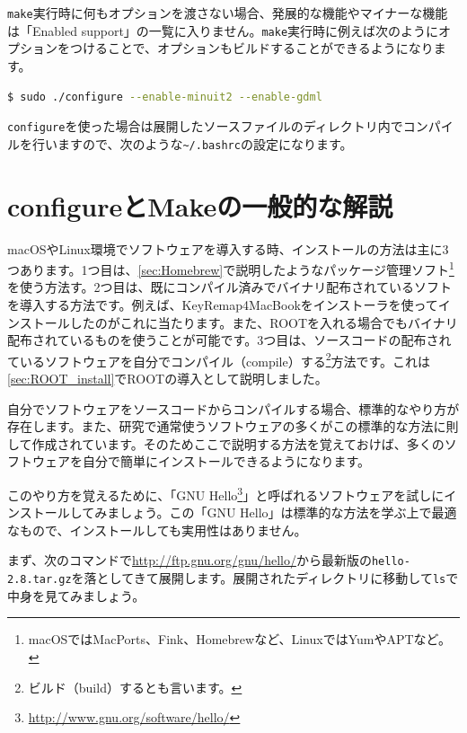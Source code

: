 \texttt{make}実行時に何もオプションを渡さない場合、発展的な機能やマイナーな機能は「Enabled support」の一覧に入りません。\texttt{make}実行時に例えば次のようにオプションをつけることで、オプションもビルドすることができるようになります。

\begin{lstlisting}[language=bash]
$ sudo ./configure --enable-minuit2 --enable-gdml
\end{lstlisting}

\texttt{configure}を使った場合は展開したソースファイルのディレクトリ内でコンパイルを行いますので、次のような\texttt{\~{}/.bashrc}の設定になります。
\begin{NoFloat}

\end{NoFloat}

\section{configureとMakeの一般的な解説}

macOSやLinux環境でソフトウェアを導入する時、インストールの方法は主に3つあります。1つ目は、\ref{sec:Homebrew}で説明したようなパッケージ管理ソフト\footnote{macOSではMacPorts、Fink、Homebrewなど、LinuxではYumやAPTなど。}を使う方法す。2つ目は、既にコンパイル済みでバイナリ配布されているソフトを導入する方法です。例えば、KeyRemap4MacBookをインストーラを使ってインストールしたのがこれに当たります。また、ROOTを入れる場合でもバイナリ配布されているものを使うことが可能です。3つ目は、ソースコードの配布されているソフトウェアを自分でコンパイル（compile）する\footnote{ビルド（build）するとも言います。}方法です。これは\ref{sec:ROOT_install}でROOTの導入として説明しました。

自分でソフトウェアをソースコードからコンパイルする場合、標準的なやり方が存在します。また、研究で通常使うソフトウェアの多くがこの標準的な方法に則して作成されています。そのためここで説明する方法を覚えておけば、多くのソフトウェアを自分で簡単にインストールできるようになります。

このやり方を覚えるために、「GNU Hello\footnote{\url{http://www.gnu.org/software/hello/}}」と呼ばれるソフトウェアを試しにインストールしてみましょう。この「GNU Hello」は標準的な方法を学ぶ上で最適なもので、インストールしても実用性はありません。

まず、次のコマンドで\url{http://ftp.gnu.org/gnu/hello/}から最新版の\texttt{hello-2.8.tar.gz}を落としてきて展開します。展開されたディレクトリに移動して\texttt{ls}で中身を見てみましょう。

